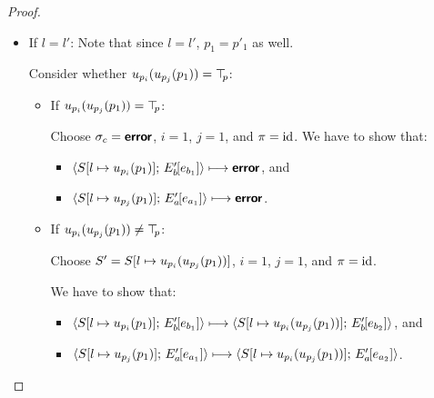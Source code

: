 \begin{proof}
\begin{enumerate}
\begin{enumerate}
\begin{itemize}
        \item If $l = l'$:
          Note that since $l = l'$, $p_1 = p'_1$ as well.

          Consider whether $u_{p_i}(u_{p_j}(p_1)) = \top\hspace{-0.85mm}_{p}$:
          \begin{itemize}
          \item If $u_{p_i}(u_{p_j}(p_1)) = \top\hspace{-0.85mm}_{p}$:

            Choose $\sigma_c = \textbf{\textsf{error}}$, $i = 1$, $j = 1$, and $\pi =
            \mathrm{id}$.  We have to show that:

            \begin{itemize}
            \item
              $\langle S[l \mapsto u_{p_i}(p_1)];\, E'_b\hspace{-1mm}\left[e_{b_1}\right] \rangle
              \longmapsto \textbf{\textsf{error}}$, and
            \item
              $\langle S[l \mapsto u_{p_j}(p_1)];\, E'_a\hspace{-1mm}\left[e_{a_1}\right] \rangle
              \longmapsto \textbf{\textsf{error}}$.
            \end{itemize}


          \item If $u_{p_i}(u_{p_j}(p_1)) \neq \top\hspace{-0.85mm}_{p}$:

            Choose $S' = S[l \mapsto u_{p_i}(u_{p_j}(p_1))]$, $i =
            1$, $j = 1$, and $\pi = \mathrm{id}$.

            We have to show that:
            \begin{itemize}
            \item
              $\langle S[l \mapsto u_{p_i}(p_1)];\, E'_b\hspace{-1mm}\left[e_{b_1}\right] \rangle
              \longmapsto
              \langle S[l \mapsto u_{p_i}(u_{p_j}(p_1))];\, E'_b\hspace{-1mm}\left[e_{b_2}\right] \rangle$,
              and
            \item
              $\langle S[l \mapsto u_{p_j}(p_1)];\, E'_a\hspace{-1mm}\left[e_{a_1}\right] \rangle
              \longmapsto
              \langle S[l \mapsto u_{p_i}(u_{p_j}(p_1))];\, E'_a\hspace{-1mm}\left[e_{a_2}\right] \rangle$.
            \end{itemize}


\end{itemize}
\end{itemize}
\end{enumerate}
\end{enumerate}
\end{proof}
